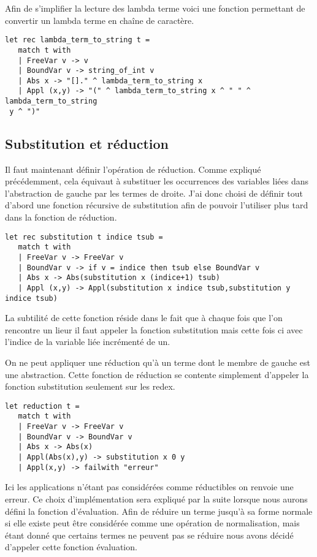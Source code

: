 \documentclass{article}
\theoremstyle{definition}
\theoremstyle{remark}
\begin{document}
Afin de s'implifier la lecture des lambda terme voici une fonction permettant
 de convertir un lambda terme en chaîne de caractère.
%
\begin{verbatim}
let rec lambda_term_to_string t = 
   match t with 
   | FreeVar v -> v 
   | BoundVar v -> string_of_int v 
   | Abs x -> "[]." ^ lambda_term_to_string x 
   | Appl (x,y) -> "(" ^ lambda_term_to_string x ^ " " ^ lambda_term_to_string
 y ^ ")"
\end{verbatim}

\subsection{Substitution et réduction}

Il faut maintenant définir l'opération de réduction. Comme expliqué
précédemment, cela équivaut à substituer les occurrences des variables
liées dans l'abstraction de gauche par les termes de droite.  J'ai
donc choisi de définir tout d'abord une fonction récursive de
substitution afin de pouvoir l'utiliser plus tard dans la fonction de
réduction.  
% 
\begin{verbatim}
let rec substitution t indice tsub = 
   match t with 
   | FreeVar v -> FreeVar v 
   | BoundVar v -> if v = indice then tsub else BoundVar v 
   | Abs x -> Abs(substitution x (indice+1) tsub) 
   | Appl (x,y) -> Appl(substitution x indice tsub,substitution y indice tsub)
\end{verbatim}

La subtilité de cette fonction réside dans le fait que à
chaque fois que l'on rencontre un lieur il faut appeler la fonction
substitution mais cette fois ci avec l'indice de la variable liée
incrémenté de un.

On ne peut appliquer une réduction qu'à un terme dont le membre de
gauche est une abstraction.  Cette fonction de réduction se contente
simplement d'appeler la fonction substitution seulement sur les redex.
 
\begin{verbatim}
let reduction t = 
   match t with 
   | FreeVar v -> FreeVar v 
   | BoundVar v -> BoundVar v 
   | Abs x -> Abs(x) 
   | Appl(Abs(x),y) -> substitution x 0 y 
   | Appl(x,y) -> failwith "erreur"
\end{verbatim}

Ici les applications n'étant pas considérées comme réductibles on
renvoie une erreur.  Ce choix d'implémentation sera expliqué par la
suite lorsque nous aurons défini la fonction d'évaluation.  Afin de
réduire un terme jusqu'à sa forme normale si elle existe peut être
considérée comme une opération de normalisation, mais étant donné que
certains termes ne peuvent pas se réduire nous avons décidé d'appeler
cette fonction évaluation. 
\end{document}
